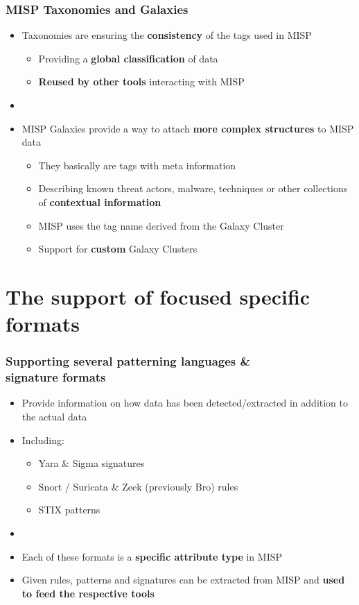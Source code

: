 \begin{frame}
    \frametitle{MISP Taxonomies and Galaxies}
    \begin{itemize}
        \item Taxonomies are ensuring the \textbf{consistency} of the tags used in MISP
        \begin{itemize}
            \item Providing a \textbf{global classification} of data
            \item \textbf{Reused by other tools} interacting with MISP
        \end{itemize}
        \item []
        \item MISP Galaxies provide a way to attach \textbf{more complex structures} to MISP data
        \begin{itemize}
            \item They basically are tags with meta information
            \item Describing known threat actors, malware, techniques or other collections of \textbf{contextual information}
            \item MISP uses the tag name derived from the Galaxy Cluster
            \item Support for \textbf{custom} Galaxy Clusters
        \end{itemize}
    \end{itemize}
\end{frame}

\section{The support of focused specific formats}

\begin{frame}
    \frametitle{Supporting several patterning languages \& \\ signature formats}
    \begin{itemize}
        \item Provide information on how data has been detected/extracted in addition to the actual data
        \item Including:
        \begin{itemize}
            \item Yara \& Sigma signatures
            \item Snort / Suricata \& Zeek (previously Bro) rules
            \item STIX patterns
        \end{itemize}
        \item []
        \item Each of these formats is a \textbf{specific attribute type} in MISP
        \item Given rules, patterns and signatures can be extracted from MISP and \textbf{used to feed the respective tools}
    \end{itemize}
\end{frame}

